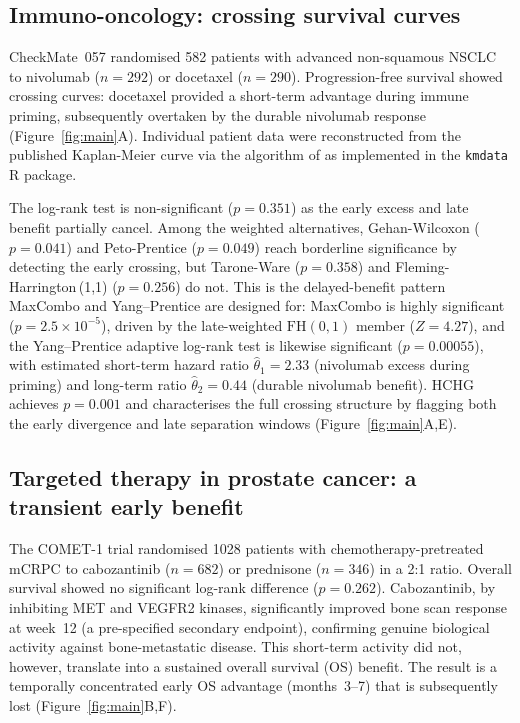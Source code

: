 \documentclass[11pt]{article}
\begin{document}
\subsection*{Immuno-oncology: crossing survival curves}

CheckMate~057 \citep{borghaei2015} randomised 582 patients with advanced
non-squamous NSCLC to nivolumab ($n=292$) or docetaxel ($n=290$).
Progression-free survival showed crossing curves: docetaxel provided a
short-term advantage during immune priming, subsequently overtaken by the
durable nivolumab response (Figure~\ref{fig:main}A). Individual patient
data were reconstructed from the published Kaplan-Meier curve via the
algorithm of \citet{guyot2012} as implemented in the \texttt{kmdata}
R package.

The log-rank test is non-significant ($p = 0.351$) as the early excess
and late benefit partially cancel. Among the weighted alternatives,
Gehan-Wilcoxon ($p = 0.041$) and Peto-Prentice ($p = 0.049$) reach
borderline significance by detecting the early crossing, but
Tarone-Ware ($p = 0.358$) and Fleming-Harrington\,(1,1) ($p = 0.256$)
do not. This is the delayed-benefit pattern MaxCombo and Yang--Prentice
are designed for: MaxCombo is highly significant ($p = 2.5 \times 10^{-5}$),
driven by the late-weighted $\mathrm{FH}(0,1)$ member ($Z = 4.27$), and
the Yang--Prentice adaptive log-rank test is likewise significant
($p = 0.00055$), with estimated short-term hazard ratio $\hat\theta_1 = 2.33$
(nivolumab excess during priming) and long-term ratio $\hat\theta_2 = 0.44$
(durable nivolumab benefit). HCHG achieves $p = 0.001$ and characterises
the full crossing structure by flagging both the early divergence and late
separation windows (Figure~\ref{fig:main}A,E).

\subsection*{Targeted therapy in prostate cancer: a transient early benefit}

The COMET-1 trial \citep{smith2016} randomised 1028 patients with
chemotherapy-pretreated mCRPC to cabozantinib ($n=682$) or prednisone
($n=346$) in a 2:1 ratio. Overall survival showed no significant
log-rank difference ($p = 0.262$). Cabozantinib, by inhibiting
MET and VEGFR2 kinases, significantly improved bone scan response at
week~12 (a pre-specified secondary endpoint), confirming genuine
biological activity against bone-metastatic disease.
This short-term activity did not, however, translate into a sustained overall survival (OS) benefit. 
The result is a temporally concentrated early OS advantage
(months~3--7) that is subsequently lost (Figure~\ref{fig:main}B,F).
\end{document}
